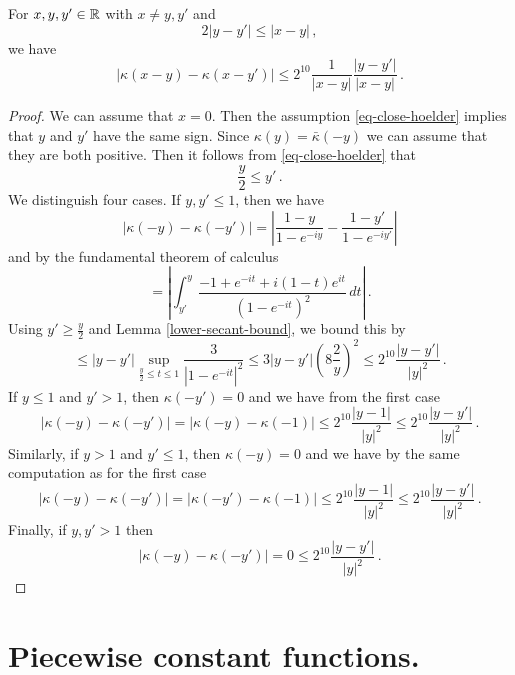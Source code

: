 {\begin{lemma}
\label{Hilbert-kernel-regularity}
    For $x,y,y'\in {\mathbb{R}}$ with $x\neq y,y'$ and
    \begin{equation}
        \label{eq-close-hoelder}
        2|y-y'|\le |x-y|\, ,
    \end{equation}
    we have
    \begin{equation}\label{eqcarl301}
        |\kappa(x-y) - \kappa(x-y')|\le 2^{10}\frac{1}{|x-y|} \frac{|y-y'|}{|x-y|}\, .
    \end{equation}
\end{lemma}

\begin{proof}
    We can assume that $x = 0$. Then the assumption \eqref{eq-close-hoelder} implies that $y$ and $y'$ have the same sign. Since $\kappa(y) = \bar \kappa(-y)$ we can assume that they are both positive. Then it follows from \eqref{eq-close-hoelder} that
    $$
        \frac{y}{2} \le y' \,.
    $$
    We distinguish four cases. If $y, y' \le 1$, then we have
    $$
        |\kappa(-y) - \kappa(-y')| = \left|  \frac{1 - y}{1- e^{-iy}} - \frac{1 - y'}{1- e^{-iy'}}\right|
    $$
    and by the fundamental theorem of calculus
    $$
        = \left| \int_{y'}^{y} \frac{-1 + e^{-it} + i(1-t)e^{it}}{(1 - e^{-it})^2} \,dt \right|\,.
    $$
    Using $y' \ge \frac{y}{2}$ and Lemma \ref{lower-secant-bound}, we bound this by
    $$
        \le |y - y'| \sup_{\frac{y}{2} \le t \le 1} \frac{3}{|1 - e^{-it}|^2}  \le 3 |y-y'| (8 \frac{2}{y})^2 \le 2^{10} \frac{|y-y'|}{|y|^2}\,.
    $$
    If $y \le 1$ and $y' > 1$, then $\kappa(-y') = 0$ and we have from the first case
    $$
        |\kappa(-y) - \kappa(-y')| = |\kappa(-y) - \kappa(-1)| \le 2^{10} \frac{|y-1|}{|y|^2} \le 2^{10} \frac{|y-y'|}{|y|^2}\,.
    $$
    Similarly, if $y > 1$ and $y' \le 1$, then $\kappa(-y) = 0$ and we have by the same computation as for the first case
    $$
        |\kappa(-y) - \kappa(-y')| = |\kappa(-y') - \kappa(-1)| \le 2^{10} \frac{|y-1|}{|y|^2} \le 2^{10} \frac{|y-y'|}{|y|^2}\,.
    $$
    Finally, if $y, y' > 1$ then
    $$
        |\kappa(-y) - \kappa(-y')| = 0 \le 2^{10} \frac{|y-y'|}{|y|^2}\,.
    $$
\end{proof}









\section{Piecewise constant functions.}
\label{10piecewise}









}
